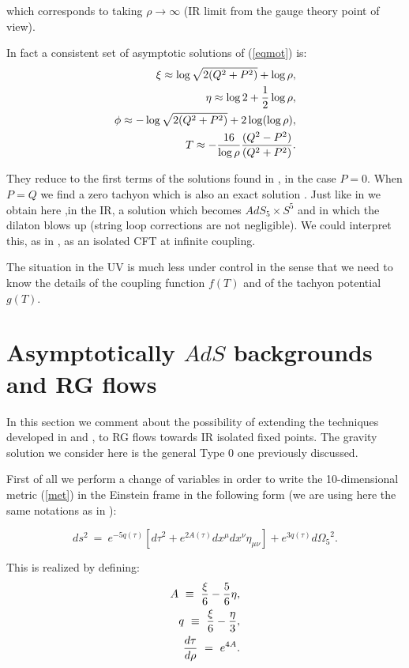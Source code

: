 \documentclass[a4paper,12pt]{article}
\def\half{{1 \over 2}}
\begin{document}
\noindent which corresponds to taking $\rho\rightarrow\infty$ (IR limit from the gauge
 theory point of view).

In fact a consistent set of asymptotic solutions of (\ref{eqmot}) is:
\begin{eqnarray}
\xi\approx \log \sqrt{2(Q^2 +P^2)} + \log\rho , \nonumber \\
\eta\approx \log 2 + \half \log\rho , \nonumber \\
\phi\approx  -\log \sqrt{2(Q^2 +P^2)} + 2\log(\log\rho), \nonumber \\
T \approx {-{16\over{\log\rho}}{(Q^2-P^2)\over{(Q^2+P^2)}}}.
\label{eqgen} 
\end{eqnarray}

\noindent They reduce to the first terms of the solutions found in \cite{kt}, \cite{kt0}
in the case $P=0$. When $P=Q$ we find a zero tachyon which is also an exact
 solution \cite{kt1}. Just like in \cite{kt0} we obtain here ,in the IR, 
 a solution which becomes $AdS_5\times S^5$ and in which the dilaton blows 
 up (string loop corrections are not negligible). We could interpret this, as in
\cite{kt0}, as an isolated CFT at infinite coupling.

The situation in the UV is much less under control in the sense that we need 
to know the details of the coupling function $f(T)$ and of the tachyon potential $g(T)$. 


\section{Asymptotically $AdS$ backgrounds and RG flows}
In this  section we comment about the possibility of extending the techniques developed in \cite{gppz} and
\cite{freed}, to RG flows towards IR isolated fixed points. 
The gravity solution we consider here is the general Type 0 one previously 
discussed.

First of all we perform a change of variables in order to write the 10-dimensional metric (\ref{met}) in the Einstein frame in the following form (we are using here the same notations as in \cite{ktfrac}):

\begin{equation}
ds^2~=~e^{-5q(\tau)}\left[{d\tau}^2 + e^{2A(\tau)}dx^{\mu}dx^{\nu}\eta_{\mu\nu}\right] +e^{3q(\tau)}{d\Omega_5}^2 .
\end{equation}

This is realized by defining:
\begin{eqnarray}
A~\equiv~{\xi\over6}-{5\over6}\eta ,\nonumber \\
q~\equiv~{\xi\over6}-{\eta\over3}, \nonumber \\
{d\tau\over{d\rho}}~=~e^{4A}.
\end{eqnarray}
\end{document}
